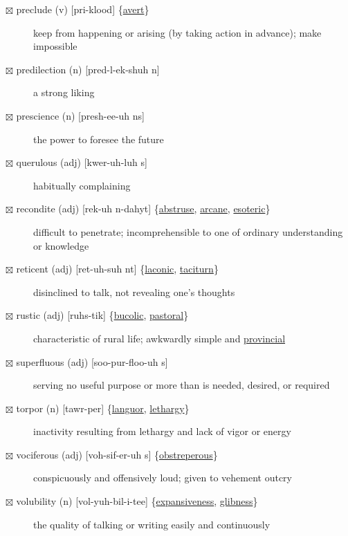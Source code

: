 \documentclass[11pt]{article}
\begin{document}
\begin{description}
\item[{$\boxtimes$ \label{org14eb2ce}preclude (v) [pri-klood] \{\hyperref[org78892f0]{avert}\}}] keep from happening or arising (by taking action in advance); make impossible
\item[{$\boxtimes$ predilection (n) [pred-l-ek-shuh n]}] a strong liking
\item[{$\boxtimes$ prescience (n) [presh-ee-uh ns]}] the power to foresee the future
\item[{$\boxtimes$ querulous (adj) [kwer-uh-luh s]}] habitually complaining
\item[{$\boxtimes$ \label{org7a770d8}recondite (adj) [rek-uh n-dahyt] \{\hyperref[org6ddbcd3]{abstruse}, \hyperref[org41835e1]{arcane}, \hyperref[orga87f059]{esoteric}\}}] difficult to penetrate; incomprehensible to one of ordinary understanding or knowledge
\item[{$\boxtimes$ \label{orgb962b96}reticent (adj) [ret-uh-suh nt] \{\hyperref[orgb49cb86]{laconic}, \hyperref[orgbeffa4e]{taciturn}\}}] disinclined to talk, not revealing one's thoughts
\item[{$\boxtimes$ \label{org9afee9b}rustic (adj) [ruhs-tik] \{\hyperref[org534bd51]{bucolic}, \hyperref[orge85ac7b]{pastoral}\}}] characteristic of rural life; awkwardly simple and \hyperref[org4804e7c]{provincial}
\item[{$\boxtimes$ superfluous (adj) [soo-pur-floo-uh s]}] serving no useful purpose or more than is needed, desired, or required
\item[{$\boxtimes$ \label{org14af850} torpor (n) [tawr-per] \{\hyperref[orgdf56950]{languor}, \hyperref[orgfcf9b05]{lethargy}\}}] inactivity resulting from lethargy and lack of vigor or energy
\item[{$\boxtimes$ \label{org8a41bd3}vociferous (adj) [voh-sif-er-uh s] \{\hyperref[orgfc4424c]{obstreperous}\}}] conspicuously and offensively loud; given to vehement outcry
\item[{$\boxtimes$ volubility (n) [vol-yuh-bil-i-tee] \{\hyperref[org44395ef]{expansiveness}, \hyperref[org60a9dab]{glibness}\}}] the quality of talking or writing easily and continuously
\end{description}
\end{document}
